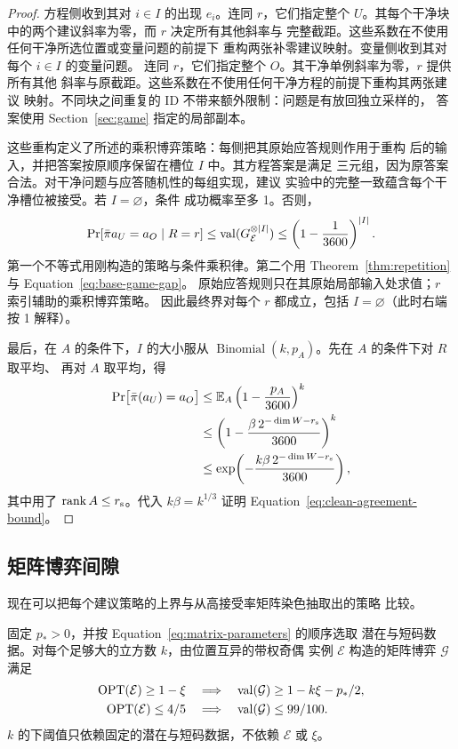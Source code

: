 \begin{proof}
方程侧收到其对 $i\in I$ 的出现 $e_i$。连同 $r$，它们指定整个
$U$。其每个干净块中的两个建议斜率为零，而 $r$ 决定所有其他斜率与
完整截距。这些系数在不使用任何干净所选位置或变量问题的前提下
重构两张补零建议映射。变量侧收到其对每个 $i\in I$ 的变量问题。
连同 $r$，它们指定整个 $O$。其干净单例斜率为零，$r$ 提供所有其他
斜率与原截距。这些系数在不使用任何干净方程的前提下重构其两张建议
映射。不同块之间重复的 ID 不带来额外限制：问题是有放回独立采样的，
答案使用 Section~\ref{sec:game} 指定的局部副本。

这些重构定义了所述的乘积博弈策略：每侧把其原始应答规则作用于重构
后的输入，并把答案按原顺序保留在槽位 $I$ 中。其方程答案是满足
三元组，因为原答案合法。对干净问题与应答随机性的每组实现，建议
实验中的完整一致蕴含每个干净槽位被接受。若 $I=\varnothing$，条件
成功概率至多 1。否则，
\[
 \Pr[\bar\pi a_U=a_O\mid R=r]
 \le \operatorname{val}(G_{\mathcal E}^{\otimes\lvert I\rvert})
 \le \left(1-\frac{1}{3600}\right)^{\lvert I\rvert}.
\]
第一个不等式用刚构造的策略与条件乘积律。第二个用
Theorem~\ref{thm:repetition} 与 Equation~\eqref{eq:base-game-gap}。
原始应答规则只在其原始局部输入处求值；$r$ 索引辅助的乘积博弈策略。
因此最终界对每个 $r$ 都成立，包括 $I=\varnothing$（此时右端按 1
解释）。

最后，在 $A$ 的条件下，$I$ 的大小服从
$\operatorname{Binomial}(k,p_A)$。先在 $A$ 的条件下对 $R$ 取平均、
再对 $A$ 取平均，得
\begin{align*}
 \Pr\bigl[\bar\pi(a_U)=a_O\bigr]
 &\le \mathbb E_A\left(1-\frac{p_A}{3600}\right)^k\\
 &\le\left(1-\frac{\beta\,2^{-\dim W-r_{\rm s}}}{3600}\right)^k\\
 &\le \exp\!\left(
 -\frac{k\beta\,2^{-\dim W-r_{\rm s}}}{3600}
 \right),
\end{align*}
其中用了 $\operatorname{rank} A\le r_{\rm s}$。代入 $k\beta=k^{1/3}$ 证明
Equation~\eqref{eq:clean-agreement-bound}。
\end{proof}

\subsection{矩阵博弈间隙}

现在可以把每个建议策略的上界与从高接受率矩阵染色抽取出的策略
比较。

\begin{proposition}[可调完备性的固定间隙]
\label{prop:matrix-gap}
固定 $p_*>0$，并按 Equation~\eqref{eq:matrix-parameters} 的顺序选取
潜在与短码数据。对每个足够大的立方数 $k$，由位置互异的带权奇偶
实例 $\mathcal E$ 构造的矩阵博弈 $\mathcal G$ 满足
\[
 \begin{aligned}
 \operatorname{OPT}(\mathcal E)\ge1-\xi
 &\quad\Longrightarrow\quad
 \operatorname{val}(\mathcal G)\ge1-k\xi-p_*/2,\\
 \operatorname{OPT}(\mathcal E)\le4/5
 &\quad\Longrightarrow\quad
 \operatorname{val}(\mathcal G)\le99/100.
 \end{aligned}
\]
$k$ 的下阈值只依赖固定的潜在与短码数据，不依赖 $\mathcal E$
或 $\xi$。
\end{proposition}

